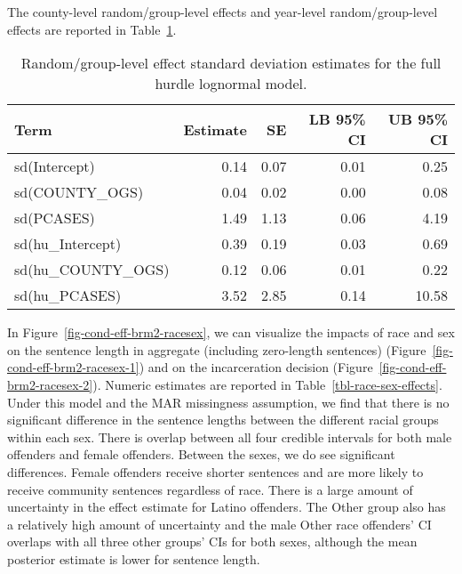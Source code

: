 \documentclass[
  letterpaper,
  DIV=11,
  numbers=noendperiod]{scrartcl}
\begin{document}
The county-level random/group-level effects and year-level
random/group-level effects are reported in Table~\ref{tbl-brms2-re}.

\hypertarget{tbl-brms2-re}{}
\begin{table}
\caption{\label{tbl-brms2-re}Random/group-level effect standard deviation estimates for the full
hurdle lognormal model. }\tabularnewline

\centering
\begin{tabular}{lrrrr}
\toprule
Term & Estimate & SE & LB 95\% CI & UB 95\% CI\\
\midrule
sd(Intercept) & 0.14 & 0.07 & 0.01 & 0.25\\
sd(COUNTY\_OGS) & 0.04 & 0.02 & 0.00 & 0.08\\
sd(PCASES) & 1.49 & 1.13 & 0.06 & 4.19\\
sd(hu\_Intercept) & 0.39 & 0.19 & 0.03 & 0.69\\
sd(hu\_COUNTY\_OGS) & 0.12 & 0.06 & 0.01 & 0.22\\
\addlinespace
sd(hu\_PCASES) & 3.52 & 2.85 & 0.14 & 10.58\\
\bottomrule
\end{tabular}
\end{table}

In Figure~\ref{fig-cond-eff-brm2-racesex}, we can visualize the impacts
of race and sex on the sentence length in aggregate (including
zero-length sentences) (Figure~\ref{fig-cond-eff-brm2-racesex-1}) and on
the incarceration decision (Figure~\ref{fig-cond-eff-brm2-racesex-2}).
Numeric estimates are reported in Table~\ref{tbl-race-sex-effects}.
Under this model and the MAR missingness assumption, we find that there
is no significant difference in the sentence lengths between the
different racial groups within each sex. There is overlap between all
four credible intervals for both male offenders and female offenders.
Between the sexes, we do see significant differences. Female offenders
receive shorter sentences and are more likely to receive community
sentences regardless of race. There is a large amount of uncertainty in
the effect estimate for Latino offenders. The Other group also has a
relatively high amount of uncertainty and the male Other race offenders'
CI overlaps with all three other groups' CIs for both sexes, although
the mean posterior estimate is lower for sentence length.
\end{document}
